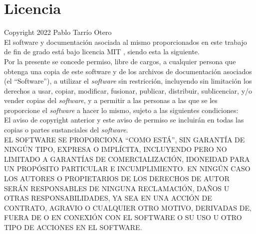 \chapter{Licencia}
\setlength{\parindent}{0cm}
Copyright \textsuperscript{\textcopyright} 2022 Pablo Tarrío Otero
\\

El software y documentación asociada al mismo proporcionados en este trabajo de
fin de grado está bajo licencia MIT \cite{mit}, siendo esta la siguiente.
\\

Por la presente se concede permiso, libre de cargos, a cualquier persona que obtenga una copia de este software y de los archivos de documentación asociados (el ``Software''), a utilizar el {\it software} sin restricción, incluyendo sin limitación los derechos a usar, copiar, modificar, fusionar, publicar, distribuir, sublicenciar, y/o vender copias del {\it software}, y a permitir a las personas a las que se les proporcione el {\it software} a hacer lo mismo, sujeto a las siguientes condiciones:
\\

El aviso de copyright anterior y este aviso de permiso se incluirán en todas las copias o partes sustanciales del {\it software}.
\\

EL SOFTWARE SE PROPORCIONA ``COMO ESTÁ'', SIN GARANTÍA DE NINGÚN TIPO, EXPRESA O IMPLÍCITA, INCLUYENDO PERO NO LIMITADO A GARANTÍAS DE COMERCIALIZACIÓN, IDONEIDAD PARA UN PROPÓSITO PARTICULAR E INCUMPLIMIENTO. EN NINGÚN CASO LOS AUTORES O PROPIETARIOS DE LOS DERECHOS DE AUTOR SERÁN RESPONSABLES DE NINGUNA RECLAMACIÓN, DAÑOS U OTRAS RESPONSABILIDADES, YA SEA EN UNA ACCIÓN DE CONTRATO, AGRAVIO O CUALQUIER OTRO MOTIVO, DERIVADAS DE, FUERA DE O EN CONEXIÓN CON EL SOFTWARE O SU USO U OTRO TIPO DE ACCIONES EN EL SOFTWARE.